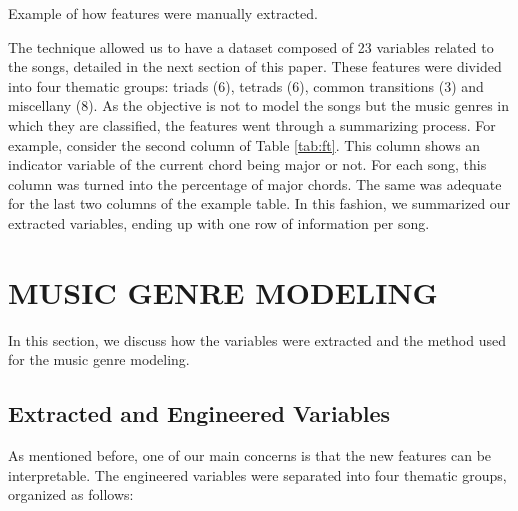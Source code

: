\documentclass[twocolumn]{article}
\begin{document}
\begin{table}[ht]
\caption{Example of how features were manually extracted.} 

\label{tab:ft}
\end{table}

The technique allowed us to have a dataset
composed of 23 variables related to the songs,
detailed in the next section
of this paper. These features were divided into four
thematic groups: triads (6),
tetrads (6), common transitions (3) and miscellany (8). 
As the objective is not to model the songs but 
the music genres in which they are classified,  
the features went through a summarizing process.
For example, consider the second column of 
Table \ref{tab:ft}. This column shows an indicator
variable of the current chord being major
or not. For each song, this column was turned into the percentage of major chords. The
same was adequate for the last two columns of the
example table. In this fashion, we summarized 
our extracted variables, ending
up with one row of information per song. 

\section{MUSIC GENRE MODELING}\label{sec:model}

In this section, we discuss how the variables
were extracted and the method used for the 
music genre modeling. 


\subsection{Extracted and Engineered Variables}

As mentioned before, one of our main
concerns is that the new features
can be interpretable. The engineered variables 
were separated into four thematic groups,
organized as follows:  
\end{document}
